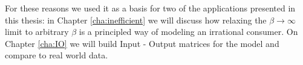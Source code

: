 For these reasons we used it as a basis for two of the applications presented in this thesis: in Chapter \ref{cha:inefficient} we will discuss how relaxing the $\beta \to \infty$ limit to arbitrary $\beta$ is a principled way of modeling an irrational consumer. On Chapter \ref{cha:IO} we will build Input - Output matrices for the model and compare to real world data.